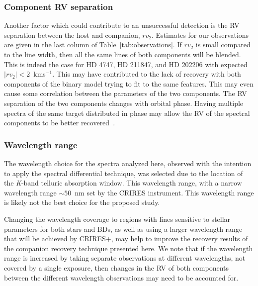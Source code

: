 \documentclass[fleqn,usenatbib]{mnras}
\begin{document}
\subsubsection{Component RV separation}
\label{subsubsec:rv_seperation}
Another factor which could contribute to an unsuccessful detection is the RV separation between the host and companion, \(rv_2\). Estimates for our observations are given in the last column of Table~\ref{tab:observations}. If \({rv}_2\) is small compared to the line width, then all the same lines of both components will be blended. This is indeed the case for {HD 4747}, {HD 211847}, and {HD 202206} with expected \(|{rv}_2| < 2\)~kms\(^{-1}\). This may have contributed to the lack of recovery with both components of the binary model trying to fit to the same features. This may even cause some correlation between the parameters of the two components. The RV separation of the two components changes with orbital phase. Having multiple spectra of the same target distributed in phase may allow the RV of the spectral components to be better recovered~\citep[e.g.][]{czekala_disentangling_2017, sablowski_spectral_2016}. 


\subsubsection {Wavelength range}
\label{subsubsec:wavelenght_range_limitation}
The wavelength choice for the spectra analyzed here, observed with the intention to apply the spectral differential technique, was selected due to the location of the \textit{K}-band telluric absorption window. This wavelength range, with a narrow wavelength range \(\sim50\)~nm set by the CRIRES instrument. This wavelength range is likely not the best choice for the proposed study. 

Changing the wavelength coverage to regions with lines sensitive to stellar parameters for both stars and BDs, as well as using a larger wavelength range that will be achieved by CRIRES+, may help to improve the recovery results of the companion recovery technique presented here. We note that if the wavelength range is increased by taking separate observations at different wavelengths, not covered by a single exposure, then changes in the RV of both components between the different wavelength observations may need to be accounted for. 
\end{document}
